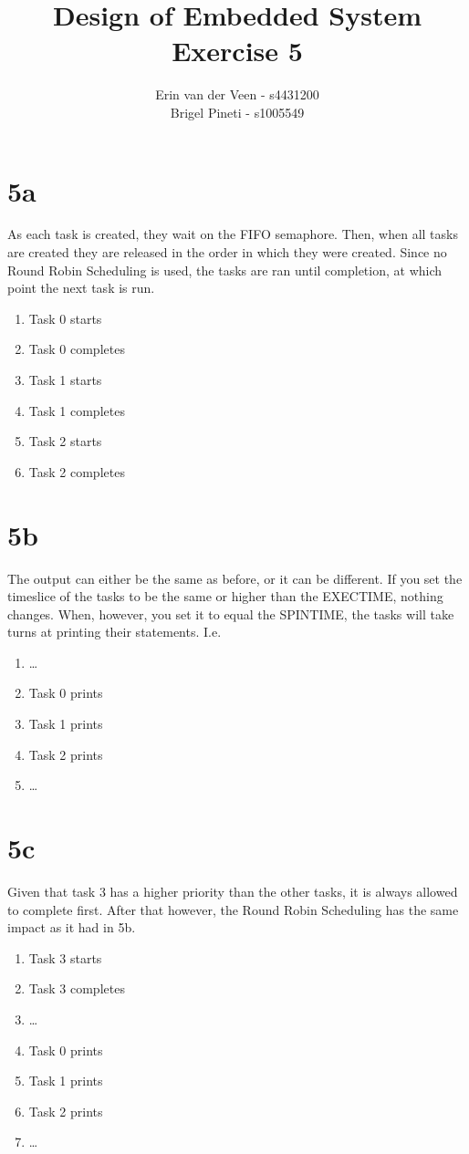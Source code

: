 \documentclass{scrartcl}
\title{Design of Embedded System\\Exercise 5}
\author{Erin van der Veen - s4431200\\
	Brigel Pineti - s1005549}
\begin{document}
\maketitle

\section*{5a}
As each task is created, they wait on the FIFO semaphore.
Then, when all tasks are created they are released in the order in which they were created.
Since no Round Robin Scheduling is used, the tasks are ran until completion, at which point the next task is run.
\begin{enumerate}
	\item Task 0 starts
	\item Task 0 completes
	\item Task 1 starts
	\item Task 1 completes
	\item Task 2 starts
	\item Task 2 completes
\end{enumerate}

\section*{5b}
The output can either be the same as before, or it can be different.
If you set the timeslice of the tasks to be the same or higher than the EXECTIME, nothing changes.
When, however, you set it to equal the SPINTIME, the tasks will take turns at printing their statements. I.e.
\begin{enumerate}
	\item \dots
	\item Task 0 prints
	\item Task 1 prints
	\item Task 2 prints
	\item \dots
\end{enumerate}

\section*{5c}
Given that task 3 has a higher priority than the other tasks, it is always allowed to complete first.
After that however, the Round Robin Scheduling has the same impact as it had in 5b.
\begin{enumerate}
	\item Task 3 starts
	\item Task 3 completes
	\item \dots
	\item Task 0 prints
	\item Task 1 prints
	\item Task 2 prints
	\item \dots
\end{enumerate}
\end{document}

